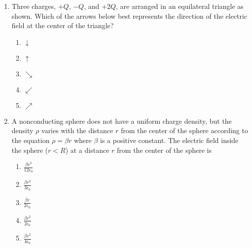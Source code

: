 \documentclass[12pt]{article}
\begin{document}
\begin{enumerate}[leftmargin=50pt,label=\underline{\hspace{0.4in}} \arabic*.]
\item Three charges, $+Q$, $−Q$, and $+2Q$, are arranged in an equilateral
  triangle as shown. Which of the arrows below best represents the direction of
  the electric field at the center of the triangle?
  
  \begin{minipage}{.5\textwidth}
  \end{minipage}
  \begin{minipage}{.4\textwidth}
    \begin{enumerate}[noitemsep,topsep=0pt,leftmargin=18pt,label=(\Alph*)]
    \item $\displaystyle\downarrow$
    \item $\displaystyle\uparrow$
    \item $\displaystyle\searrow$
    \item $\displaystyle\swarrow$
    \item $\displaystyle\nearrow$
    \end{enumerate}
\end{minipage}
  
\item A nonconducting sphere does not have a uniform charge density, but the
density $\rho$ varies with the distance $r$ from the center of the sphere
according to the equation $\rho=\beta r$ where $\beta$ is a positive constant.
The electric field inside the sphere ($r<R$) at a distance $r$ from the
center of the sphere is
\begin{enumerate}[noitemsep,topsep=0pt,leftmargin=18pt,label=(\Alph*)]
  \item $\displaystyle\frac{\beta r^2}{12\epsilon_0}$
  \item $\displaystyle\frac{\beta r^3}{3\epsilon_0}$
  \item $\displaystyle\frac{\beta r}{2\epsilon_0}$
  \item $\displaystyle\frac{\beta r^2}{2\epsilon_0}$
  \item $\displaystyle\frac{\beta r^2}{4\epsilon_0}$
  \end{enumerate}
  

\end{enumerate}
\end{document}
